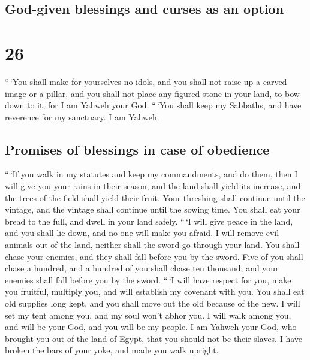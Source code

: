 \hypertarget{god-given-blessings-and-curses-as-an-option}{%
\subsection{God-given blessings and curses as an
option}\label{god-given-blessings-and-curses-as-an-option}}

\hypertarget{section-25}{%
\section{26}\label{section-25}}

 ``\,`You shall make for yourselves no idols, and you
shall not raise up a carved image or a pillar, and you shall not place
any figured stone in your land, to bow down to it; for I am Yahweh your
God.  ``\,`You shall keep my Sabbaths, and have reverence
for my sanctuary. I am Yahweh.

\hypertarget{promises-of-blessings-in-case-of-obedience}{%
\subsection{Promises of blessings in case of
obedience}\label{promises-of-blessings-in-case-of-obedience}}

 ``\,`If you walk in my statutes and keep my commandments,
and do them,  then I will give you your rains in their
season, and the land shall yield its increase, and the trees of the
field shall yield their fruit.  Your threshing shall
continue until the vintage, and the vintage shall continue until the
sowing time. You shall eat your bread to the full, and dwell in your
land safely.  ``\,`I will give peace in the land, and you
shall lie down, and no one will make you afraid. I will remove evil
animals out of the land, neither shall the sword go through your land.
 You shall chase your enemies, and they shall fall before
you by the sword.  Five of you shall chase a hundred, and
a hundred of you shall chase ten thousand; and your enemies shall fall
before you by the sword.  ``\,`I will have respect for
you, make you fruitful, multiply you, and will establish my covenant
with you.  You shall eat old supplies long kept, and you
shall move out the old because of the new.  I will set my
tent among you, and my soul won't abhor you.  I will walk
among you, and will be your God, and you will be my people.
 I am Yahweh your God, who brought you out of the land of
Egypt, that you should not be their slaves. I have broken the bars of
your yoke, and made you walk upright.

